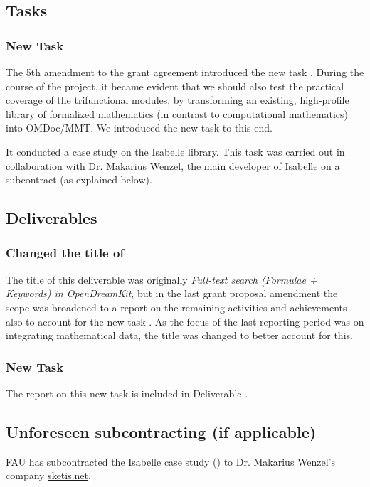 \subsection{Tasks}

\subsubsection{New Task }

The 5th amendment to the grant agreement introduced the new task .
During the course of the project, it became evident that we should also test the practical coverage of the trifunctional modules, by
transforming an existing, high-profile library of formalized mathematics (in contrast to computational mathematics) into OMDoc/MMT.
We introduced the new task to this end.

It conducted a case study on the Isabelle library.
This task was carried out in collaboration with Dr. Makarius Wenzel, the main developer of Isabelle on a subcontract (as explained below).

\subsection{Deliverables}

\subsubsection{Changed the title of }
The title of this deliverable was originally \emph{Full-text search
  (Formulae + Keywords) in OpenDreamKit}, but in the last grant
proposal amendment the scope was broadened to a report on the
remaining  activities and achievements -- also to
account for the new task . As the focus of
the last reporting period was on integrating mathematical data, the title was changed to better account for this.

\subsubsection{New Task }
The report on this new task is included in Deliverable .

\subsection{Unforeseen subcontracting (if applicable)}
FAU has subcontracted the Isabelle case study () to Dr. Makarius Wenzel's company \url{sketis.net}.

